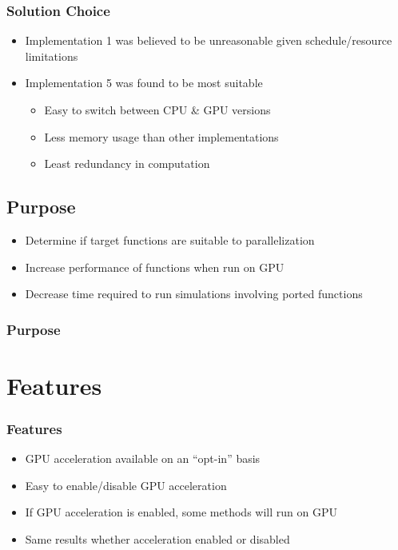 \documentclass{beamer}
\begin{document}
\begin{frame}
\frametitle{Solution Choice}
\begin{itemize}
\item Implementation 1 was believed to be unreasonable given schedule/resource limitations
\item Implementation 5 was found to be most suitable
\begin{itemize}
\item Easy to switch between CPU \& GPU versions
\item Less memory usage than other implementations
\item Least redundancy in computation
\end{itemize}
\end{itemize}
\end{frame}

\subsection{Purpose}
\begin{frame}
\begin{itemize}
\item Determine if target functions are suitable to parallelization 
\item Increase performance of functions when run on GPU
\item Decrease time required to run simulations involving ported functions
\end{itemize}
\frametitle{Purpose}
\end{frame}

\section{Features}
\begin{frame}
\frametitle{Features}
\begin{itemize}
\item GPU acceleration available on an ``opt-in'' basis
\item Easy to enable/disable GPU acceleration
\item If GPU acceleration is enabled, some methods will run on GPU
\item Same results whether acceleration enabled or disabled
\end{itemize}
\end{frame}
\end{document}
